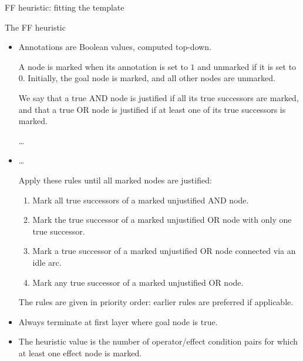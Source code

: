\documentclass{gkibeamer}
\begin{document}
\begin{frame}{FF heuristic: fitting the template\only<all:2-3>{ (ctd.)}}
  \begin{block}{The FF heuristic {\hff}}
    \begin{overprint}
    \begin{itemize}
    \item Annotations are \alert{Boolean values}, computed top-down.

      \smallskip

      A node is \alert{marked} when its annotation is set to $1$ and
      \alert{unmarked} if it is set to $0$. Initially, the goal node
      is marked, and all other nodes are unmarked.

      \smallskip

      We say that a true AND node is \alert{justified} if all its true
      successors are marked, and that a true OR node is
      \alert{justified} if at least one of its true successors is
      marked.

      \dots
    \end{itemize}
    \begin{itemize}
    \item \dots

      \smallskip

      Apply these rules until \alert{all marked nodes are justified}:
      \begin{enumerate}
      \item Mark all true successors of a marked unjustified AND node.
      \item Mark the true successor of a marked unjustified OR node
        with only one true successor.
      \item Mark a true successor of a marked unjustified OR node
        connected via an idle arc.
      \item Mark any true successor of a marked unjustified OR node.
      \end{enumerate}
      
      The rules are given in priority order: earlier rules are
      preferred if applicable.
    \end{itemize}

    \begin{itemize}
    \item \alert{Always terminate} at first layer where goal node is
      true.
    \end{itemize}
    
    \begin{itemize}
    \item The heuristic value is the \alert{number of operator/effect
      condition pairs} for which \alert{at least one} effect node is
      marked.
    \end{itemize}
    \end{overprint}
  \end{block}
\end{frame}
\end{document}

